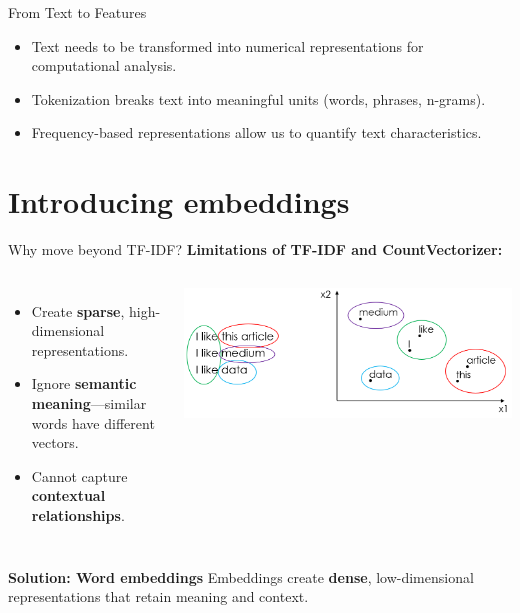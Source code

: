 \documentclass[handout]{beamer}
\begin{document}


\begin{frame}{From Text to Features}
	\begin{itemize}
		\item Text needs to be transformed into numerical representations for computational analysis.
		\item Tokenization breaks text into meaningful units (words, phrases, n-grams).
		\item Frequency-based representations allow us to quantify text characteristics.
	\end{itemize}
\end{frame}

\section{Introducing embeddings}

\begin{frame}{Why move beyond TF-IDF?}
    \textbf{Limitations of TF-IDF and CountVectorizer:}
    \begin{columns}
        \begin{itemize}
            \item Create \textbf{sparse}, high-dimensional representations.
            \item Ignore \textbf{semantic meaning}—similar words have different vectors.
            \item Cannot capture \textbf{contextual relationships}.
        \end{itemize}
        \includegraphics[width=\linewidth]{resources/pictures/tfidf-vs-embeddings.png}  %
    \end{columns}
    \textbf{Solution: Word embeddings}\newline
    Embeddings create \textbf{dense}, low-dimensional representations that retain meaning and context.
\end{frame}
\end{document}
